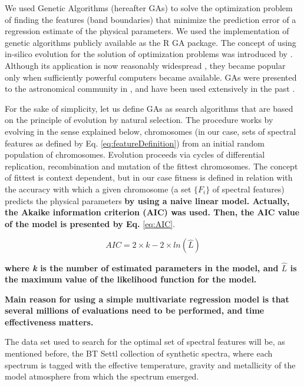 We used Genetic Algorithms (hereafter GAs) to solve the optimization
problem %
of finding the features 
(band boundaries) that minimize the prediction error of a regression
estimate of the physical parameters. We used the implementation of
genetic algorithms publicly available as the R \citep{R2013} GA
package. The concept of using in-silico evolution for the solution of
optimization problems was introduced
by \cite{holland1975adaptation}. Although its application is now
reasonably widespread \citep[see e.g.][]{goldberg1989genetic}, they
became popular only when sufficiently powerful computers became
available. GAs were presented to the astronomical community
in \cite{1995ApJS..101..309C}, and have been used extensively in the
past \citep[see][for a significant application of GAs in astronomy]{2013A&A...550A..74D}.

For the sake of simplicity, let us define GAs as
search algorithms that are based on the principle of evolution by
natural selection. The procedure works by evolving in the sense
explained below, chromosomes (in our case, sets of spectral features
as defined by Eq. \ref{eq:featureDefinition}) from an initial random
population of chromosomes. 
Evolution proceeds via cycles of differential replication,
recombination and mutation of the fittest chromosomes. The concept of
fittest is context dependent, but in our case fitness is defined in
relation with the accuracy with which a given chromosome (a set
$\{F_i\}$ of spectral features) predicts the physical parameters
\textbf{
by using a naive linear model. Actually, the Akaike information
criterion (AIC) was used. 
Then, the AIC value of the model is presented by Eq.} \ref{eq:AIC}.

\begin{equation}\label{eq:AIC}
  AIC = 2 \times k - 2 \times ln(\hat{L}) 
\end{equation}

\zeroindent{}
\textbf{
where \textit{k} is the number of estimated parameters in the model, 
and $\hat{L}$ is the maximum value of the likelihood function for the model.
} 

\textbf{
Main reason for using a simple
multivariate regression model is that several millions of
evaluations need to be performed, and time effectiveness matters.
}

The data set used to search for the optimal set of spectral features
will be, as mentioned before, the BT Settl collection of synthetic
spectra, where each spectrum is tagged with the effective temperature,
gravity and metallicity of the model atmosphere from which the
spectrum emerged.


